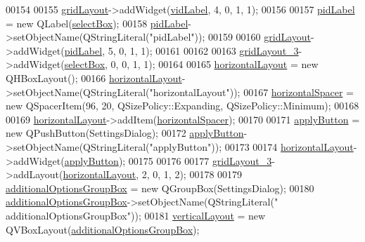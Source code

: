 \begin{DoxyCode}
00154 
00155         \hyperlink{a00082_a07d152c7cc63e2cffdda613baea54c0f}{gridLayout}->addWidget(\hyperlink{a00082_a50c8fdd36faae6146740e37728af71f2}{vidLabel}, 4, 0, 1, 1);
00156 
00157         \hyperlink{a00082_a8ad53ddf3a11421d99dfa6fec8c92cfc}{pidLabel} = \textcolor{keyword}{new} QLabel(\hyperlink{a00082_aea3871481f7ecb94f1835e519631f9a2}{selectBox});
00158         \hyperlink{a00082_a8ad53ddf3a11421d99dfa6fec8c92cfc}{pidLabel}->setObjectName(QStringLiteral(\textcolor{stringliteral}{"pidLabel"}));
00159 
00160         \hyperlink{a00082_a07d152c7cc63e2cffdda613baea54c0f}{gridLayout}->addWidget(\hyperlink{a00082_a8ad53ddf3a11421d99dfa6fec8c92cfc}{pidLabel}, 5, 0, 1, 1);
00161 
00162 
00163         \hyperlink{a00082_a2cc53955b73f22f0cfcf508da4654b16}{gridLayout\_3}->addWidget(\hyperlink{a00082_aea3871481f7ecb94f1835e519631f9a2}{selectBox}, 0, 0, 1, 1);
00164 
00165         \hyperlink{a00082_a5519b84cf0fd4124e77643ce5600a251}{horizontalLayout} = \textcolor{keyword}{new} QHBoxLayout();
00166         \hyperlink{a00082_a5519b84cf0fd4124e77643ce5600a251}{horizontalLayout}->setObjectName(QStringLiteral(\textcolor{stringliteral}{"horizontalLayout"}));
00167         \hyperlink{a00082_a91941a5010b87cc8a0c26a641d4a7808}{horizontalSpacer} = \textcolor{keyword}{new} QSpacerItem(96, 20, QSizePolicy::Expanding, 
      QSizePolicy::Minimum);
00168 
00169         \hyperlink{a00082_a5519b84cf0fd4124e77643ce5600a251}{horizontalLayout}->addItem(\hyperlink{a00082_a91941a5010b87cc8a0c26a641d4a7808}{horizontalSpacer});
00170 
00171         \hyperlink{a00082_adc885543c05d0026019ec678b4d08c5c}{applyButton} = \textcolor{keyword}{new} QPushButton(SettingsDialog);
00172         \hyperlink{a00082_adc885543c05d0026019ec678b4d08c5c}{applyButton}->setObjectName(QStringLiteral(\textcolor{stringliteral}{"applyButton"}));
00173 
00174         \hyperlink{a00082_a5519b84cf0fd4124e77643ce5600a251}{horizontalLayout}->addWidget(\hyperlink{a00082_adc885543c05d0026019ec678b4d08c5c}{applyButton});
00175 
00176 
00177         \hyperlink{a00082_a2cc53955b73f22f0cfcf508da4654b16}{gridLayout\_3}->addLayout(\hyperlink{a00082_a5519b84cf0fd4124e77643ce5600a251}{horizontalLayout}, 2, 0, 1, 2);
00178 
00179         \hyperlink{a00082_a996d0cf4818dae895375cb43b996e0dc}{additionalOptionsGroupBox} = \textcolor{keyword}{new} QGroupBox(SettingsDialog);
00180         \hyperlink{a00082_a996d0cf4818dae895375cb43b996e0dc}{additionalOptionsGroupBox}->setObjectName(QStringLiteral(\textcolor{stringliteral}{"
      additionalOptionsGroupBox"}));
00181         \hyperlink{a00082_aad19d26806d7e14548233852ac97c26f}{verticalLayout} = \textcolor{keyword}{new} QVBoxLayout(\hyperlink{a00082_a996d0cf4818dae895375cb43b996e0dc}{additionalOptionsGroupBox});

\end{DoxyCode}
